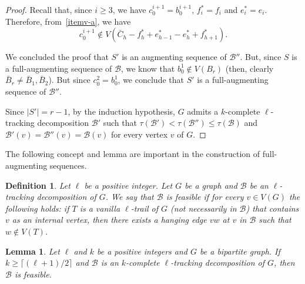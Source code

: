 \documentclass[12pt,reqno,a4paper]{amsart}
\newtheorem{lemma}[theorem]{Lemma}
\newtheorem{definition}[theorem]{Definition}
\newcommand{\B}{\mathcal{B}}
\newcommand{\full}{full}
\begin{document}
\begin{proof}
Recall that, since \(i\geq 3\), we have $c_0^{i+1} = b_0^{i+1}$, $f_i^* = f_i$ and $e_i^* = e_i$. 
Therefore,  from~\eqref{itemv-a}, we have
\begin{equation*}
c_0^{i+1} \notin  V(\bar C_h - f_h^* + e_{h-1}^*   - e_h^* + f_{h+1}^*). 
\end{equation*}

We concluded the proof that $S'$ is an augmenting sequence of $\B''$. But, since $S$ is a 
\full-augmenting sequence of $\B$, we know 
that 
$b^1_0\notin V(B_r)$ (then, clearly $\bar B_r\neq \bar B_1,\bar B_2$). But since 
$c^2_0=b^1_0$, we conclude that $S'$ is a 
\full-augmenting sequence of $\B''$.

Since \(|S'| = r-1\), by the induction hypothesis, 
\(G\) admits a $k$-complete \(\ell\)-tracking decomposition \(\B'\)
such that \(\tau(\B') < \tau(\B'') 
\leq \tau(\B)\) and $\B'(v) = \B''(v) = \B(v)$
for every vertex $v$ of $G$.
\end{proof}

The following concept and lemma are important in the construction of \full-augmenting sequences.

\begin{definition}
Let \(\ell\) be a positive integer.
Let \(G\) be a graph and  \(\B\) be an \(\ell\)-tracking decomposition of \(G\).
We say that \(\B\) is \emph{feasible} if for every \(v\in V(G)\) the
following holds: if \(T\) is a 
vanilla $\ell$-trail of $G$ (not necessarily in \(\B\)) that contains \(v\) as an internal vertex, then 
there exists a hanging edge \(vw\) at \(v\) in $\B$ 
such that \(w\notin V(T)\).
\end{definition}



\begin{lemma}\label{lemma:choose-element-all}
Let \(\ell\) and \(k\) be a positive integers and \(G\) be a bipartite graph. 
If \(k\geq \lceil (\ell +1)/2\rceil\) and 
\(\B\) is an \(k\)-complete \(\ell\)-tracking decomposition of \(G\),
then \(\B\) is feasible.
\end{lemma}
\end{document}

